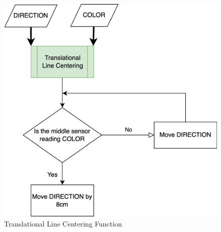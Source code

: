 \documentclass[12pt]{report}
\begin{document}
\begin{figure}[H]
    \centering
    \includegraphics[width=1\textwidth]{Images/flowchart/translational_line_centering.pdf}
    \caption{Translational Line Centering Function}
    \label{fig:fc:translational-line-centering}
\end{figure}
\end{document}
